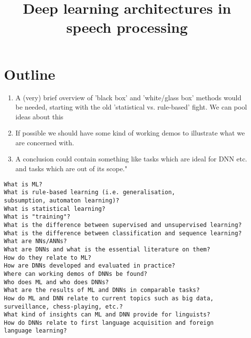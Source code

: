 \documentclass[12pt, titlepage, reqno]{article}
\title{Deep learning architectures in speech processing}
\begin{document}
\maketitle 


\section{Outline}
\begin{enumerate}
	\item A (very) brief overview of 'black box' and 'white/glass box' methods would be needed, starting with the old 'statistical vs. rule-based' fight. We can pool ideas about this
	\item If possible we should have some kind of working demos to illustrate what we are concerned with.
	\item A conclusion could contain something like tasks which are ideal for DNN etc. and tasks which are out of its scope."
\end{enumerate}
\begin{verbatim} 
What is ML?
What is rule-based learning (i.e. generalisation, 
subsumption, automaton learning)?
What is statistical learning?
What is "training"?
What is the difference between supervised and unsupervised learning?
What is the difference between classification and sequence learning?
What are NNs/ANNs?
What are DNNs and what is the essential literature on them?
How do they relate to ML?
How are DNNs developed and evaluated in practice?
Where can working demos of DNNs be found?
Who does ML and who does DNNs?
What are the results of ML and DNNs in comparable tasks?
How do ML and DNN relate to current topics such as big data, 
surveillance, chess-playing, etc.?
What kind of insights can ML and DNN provide for linguists?
How do DNNs relate to first language acquisition and foreign 
language learning? \end{verbatim}
\end{document}
